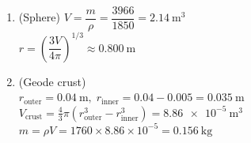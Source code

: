 \documentclass{article}
\begin{document}
\begin{enumerate}
\item (Sphere) $V = \dfrac{m}{\rho} = \dfrac{3966}{1850} = \SI{2.14}{\metre\cubed}$\\
      $r = \left(\dfrac{3V}{4\pi}\right)^{1/3} \approx \SI{0.800}{\metre}$

\item (Geode crust) \\
      $r_\text{outer} = \SI{0.04}{\metre},\; r_\text{inner} = 0.04 - 0.005 = \SI{0.035}{\metre}$\\
      $V_\text{crust} = \tfrac43\pi (r_\text{outer}^{3} - r_\text{inner}^{3})
        = \SI{8.86e-5}{\metre\cubed}$\\
      $m = \rho V = 1760 \times 8.86\times10^{-5} = \SI{0.156}{\kilogram}$
\end{enumerate}
\end{document}
